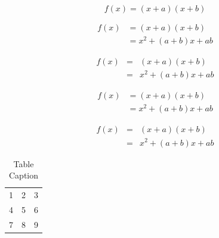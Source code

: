 \documentclass[preprint,12pt,authoryear]{elsarticle}
\begin{document}
\begin{equation*}
f(x) = (x+a)(x+b)
\end{equation*}

\begin{align}
 f(x) &= (x+a)(x+b) \\
      &= x^2 + (a+b)x + ab
\end{align}

\begin{eqnarray}
 f(x) &=& (x+a)(x+b) \nonumber\\ %
      &=& x^2 + (a+b)x + ab
\end{eqnarray}

\begin{align*}
 f(x) &= (x+a)(x+b) \\
      &= x^2 + (a+b)x + ab
\end{align*}

\begin{eqnarray*}
 f(x)&=& (x+a)(x+b) \\
     &=& x^2 + (a+b)x + ab
\end{eqnarray*}


\begin{table}[t]%
\centering%
\begin{tabular}{l c r}%
  1 & 2 & 3 \\ %
  4 & 5 & 6 \\
  7 & 8 & 9 \\
\end{tabular}
\caption{Table Caption}\label{fig1}
\end{table}
\end{document}
